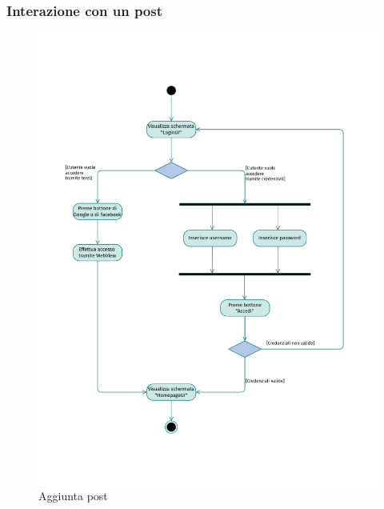 \documentclass{natourDoc}
\begin{document}
\subsubsection{Interazione con un post}
\begin{figure}[!htbp]
	\centering
	\includegraphics[width=\textwidth, page=4]{./diagrams/activity.pdf}
	\caption{Aggiunta post}
\end{figure}
\FloatBarrier
\end{document}
